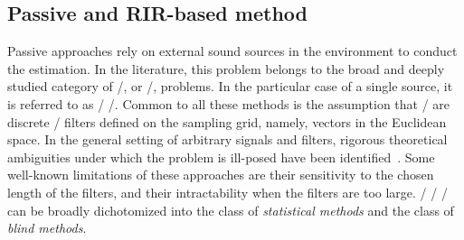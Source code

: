 \subsection{Passive and RIR-based method}\label{subsec:estimation:bce}
Passive approaches
rely on external sound sources in the environment to conduct the estimation.
In the literature, this problem belongs to the broad and deeply studied category of \BCEdef/, or \BSIdef/, problems.
In the particular case of a single source, it is referred to as \SIMO/ \BCE/.
Common to all these methods is the assumption that \RIRs/ are discrete \FIR/ filters defined on the sampling grid, namely, vectors in the Euclidean space.
In the general setting of arbitrary signals and filters, rigorous theoretical ambiguities under which the problem is ill-posed have been identified~.
Some well-known limitations of these approaches are their sensitivity to the chosen length of the filters, and their intractability when the filters are too large.
\FIR/ \SIMO/ \BCE/ can be broadly dichotomized into the class of \textit{statistical methods} and the class of \textit{blind methods}.


